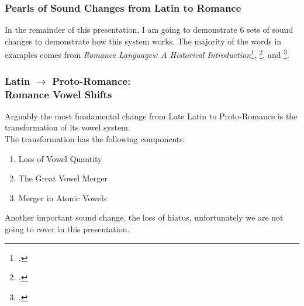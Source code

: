 \documentclass{beamer}
\begin{document}
\begin{frame}
	\frametitle{Pearls of Sound Changes from Latin to Romance}

	In the remainder of this presentation, I am going to demonstrate 6 sets of sound changes to demonstrate how this system works. The majority of the words in examples comes from \emph{Romance Languages: A Historical Introduction}\footcite{romance_his}, \footcite{lloyd_spanish}, and \footcite{penny_spanish}.

\end{frame}

\begin{frame}
	\frametitle{Latin $\rightarrow$ Proto-Romance: \\ Romance Vowel Shifts}

	Arguably the most fundamental change from Late Latin to Proto-Romance is the transformation of its vowel system. \\
	The transformation has the following components:
	\begin{enumerate}
		\item Loss of Vowel Quantity
		\item The Great Vowel Merger
		\item Merger in Atonic Vowels
	\end{enumerate}
	Another important sound change, the loss of hiatus, unfortunately we are not going to cover in this presentation.
\end{frame}
\end{document}
